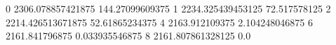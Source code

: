 0 2306.078857421875 144.27099609375
1 2234.325439453125 72.517578125
2 2214.426513671875 52.61865234375
4 2163.912109375 2.104248046875
6 2161.841796875 0.033935546875
8 2161.807861328125 0.0
